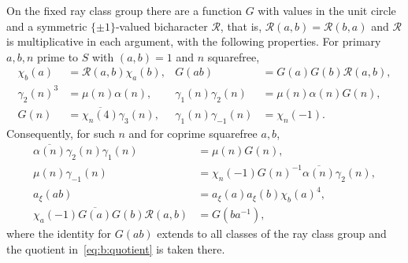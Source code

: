 \begin{lemma}\label{lem:b:arithmetic}
On the fixed ray class group there are a function $G$ with values in the unit circle and a symmetric $\{\pm1\}$-valued bicharacter $\mathcal R$, that is, $\mathcal R(a,b)=\mathcal R(b,a)$ and $\mathcal R$ is multiplicative in each argument, with the following properties. For primary $a,b,n$ prime to $S$ with $(a,b)=1$ and $n$ squarefree,
\begin{align}
  \chi_b(a)&=\mathcal R(a,b)\chi_a(b),& G(ab)&=G(a)G(b)\mathcal R(a,b),\label{eq:b:recip}\\
  \gamma_2(n)^3&=\mu(n)\alpha(n),& \gamma_1(n)\gamma_2(n)&=\mu(n)\alpha(n)G(n),\label{eq:b:gj}\\
  G(n)&=\overline{\chi_n(4)}\gamma_3(n),& \gamma_1(n)\gamma_{-1}(n)&=\chi_n(-1).\label{eq:b:g}
\end{align}
Consequently, for such $n$ and for coprime squarefree $a,b$,
\begin{align}
  \overline{\alpha(n)}\gamma_2(n)\gamma_1(n)&=\mu(n)G(n),\label{eq:b:convert1}\\
  \mu(n)\gamma_{-1}(n)&=\chi_n(-1)G(n)^{-1}\overline{\alpha(n)}\gamma_2(n),\label{eq:b:convert2}\\
  a_\xi(ab)&=a_\xi(a)a_\xi(b)\chi_b(a)^4,\label{eq:b:crta}\\
  \chi_a(-1)\overline{G(a)}G(b)\mathcal R(a,b)&=G(ba^{-1}),\label{eq:b:quotient}
\end{align}
where the identity for $G(ab)$ extends to all classes of the ray class group and the quotient in~\eqref{eq:b:quotient} is taken there.
\end{lemma}

